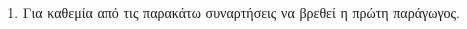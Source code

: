 \documentclass[11pt,a4paper]{article}
\begin{document}
\begin{enumerate}


\item
Για καθεμία από τις παρακάτω συναρτήσεις να βρεθεί η πρώτη παράγωγος.
\begin{multicols}{2}
\end{multicols}

\end{enumerate}
\end{document}
